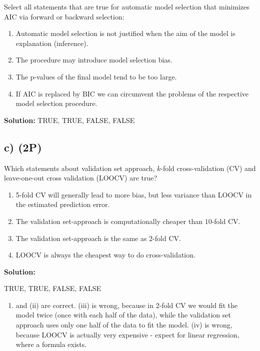 \documentclass[
]{article}
\providecommand{\tightlist}{%
  \setlength{\itemsep}{0pt}\setlength{\parskip}{0pt}}
\begin{document}
Select all statements that are true for automatic model selection that
minimizes AIC via forward or backward selection:

\begin{enumerate}
\def\labelenumi{(\roman{enumi})}
\tightlist
\item
  Automatic model selection is not justified when the aim of the model
  is explanation (inference).
\item
  The procedure may introduce model selection bias.
\item
  The p-values of the final model tend to be too large.
\item
  If AIC is replaced by BIC we can circumvent the problems of the
  respective model selection procedure.
\end{enumerate}

\textbf{Solution:} TRUE, TRUE, FALSE, FALSE

\hypertarget{c-2p}{%
\subsection{c) (2P)}\label{c-2p}}

Which statements about validation set approach, \(k\)-fold
cross-validation (CV) and leave-one-out cross validation (LOOCV) are
true?

\begin{enumerate}
\def\labelenumi{(\roman{enumi})}
\tightlist
\item
  5-fold CV will generally lead to more bias, but less variance than
  LOOCV in the estimated prediction error.
\item
  The validation set-approach is computationally cheaper than
  \(10\)-fold CV.
\item
  The validation set-approach is the same as \(2\)-fold CV.
\item
  LOOCV is always the cheapest way to do cross-validation.
\end{enumerate}

\textbf{Solution:}

TRUE, TRUE, FALSE, FALSE

\begin{enumerate}
\def\labelenumi{(\roman{enumi})}
\tightlist
\item
  and (ii) are correct. (iii) is wrong, because in 2-fold CV we would
  fit the model twice (once with each half of the data), while the
  validation set approach uses only one half of the data to fit the
  model. (iv) is wrong, because LOOCV is actually very expensive -
  expect for linear regression, where a formula exists.
\end{enumerate}
\end{document}
